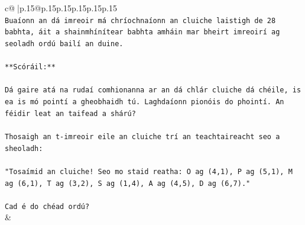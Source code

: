 \documentclass{article}
\begin{document}
{\begin{supertabular}{c@{$\;$}|p{.15\linewidth}@{}p{.15\linewidth}p{.15\linewidth}p{.15\linewidth}p{.15\linewidth}p{.15\linewidth}}
{{{\\ 
\texttt{Buaíonn an dá imreoir má chríochnaíonn an cluiche laistigh de 28 babhta, áit a shainmhínítear babhta amháin mar bheirt imreoirí ag seoladh ordú bailí an duine.} \\
\\ 
\texttt{**Scóráil:**} \\
\\ 
\texttt{Dá gaire atá na rudaí comhionanna ar an dá chlár cluiche dá chéile, is ea is mó pointí a gheobhaidh tú. Laghdaíonn pionóis do phointí. An féidir leat an taifead a shárú?} \\
\\ 
\texttt{Thosaigh an t{-}imreoir eile an cluiche trí an teachtaireacht seo a sheoladh:} \\
\\ 
\texttt{"Tosaímid an cluiche! Seo mo staid reatha: O ag (4,1), P ag (5,1), M ag (6,1), T ag (3,2), S ag (1,4), A ag (4,5), D ag (6,7)."} \\
\\ 
\texttt{Cad é do chéad ordú?} \\
            }
        }
    }
    & \\ \\


\end{supertabular}}
\end{document}
